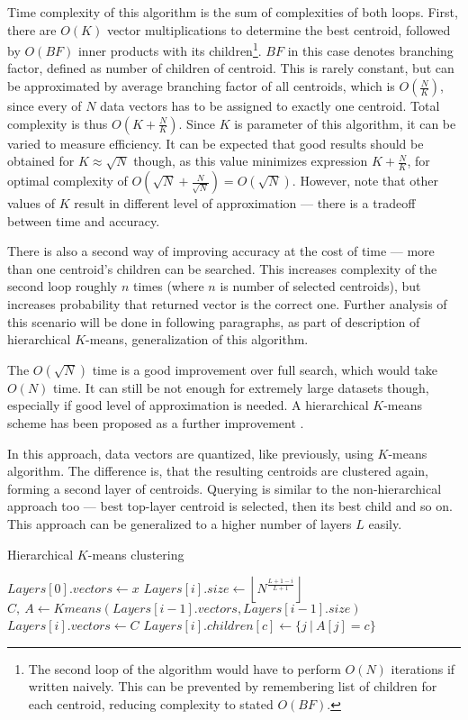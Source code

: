Time complexity of this algorithm is the sum of complexities of both loops.
First, there are $O(K)$ vector multiplications to determine the best centroid,
followed by $O(BF)$ inner products with its children\footnote{The second loop
of the algorithm would have to perform $O(N)$ iterations if written naively.
This can be prevented by remembering list of children for each centroid,
reducing complexity to stated $O(BF)$.}.
$BF$ in this case denotes
branching factor, defined as number of children of centroid. This is rarely
constant, but can be approximated by average branching factor of all centroids,
which is $O(\frac{N}{K})$, since every of $N$ data vectors has to be assigned
to exactly one centroid. Total complexity is thus $O(K + \frac{N}{K})$. Since
$K$ is parameter of this algorithm, it can be varied to measure efficiency. It
can be expected that good results should be obtained for $K \approx \sqrt{N}$ 
though, as this value minimizes expression $K + \frac{N}{K}$, for optimal
complexity of $O(\sqrt{N} + \frac{N}{\sqrt{N}}) = O(\sqrt{N})$. However, note that other
values of $K$ result in different level of approximation --- there is
a tradeoff between time and accuracy. 

There is also a second way of improving accuracy at the cost of time --- more
than one centroid's children can be searched. This increases complexity of the
second loop roughly $n$ times (where $n$ is number of selected centroids),
but increases probability that returned vector is the correct one. Further
analysis of this scenario will be done in following paragraphs, as part
of description of hierarchical $K$-means, generalization of this algorithm.


\bigskip


The $O(\sqrt{N})$ time is a good improvement over full search, which would
take $O(N)$ time. It can still be not enough for extremely large datasets
though, especially if good level of approximation is needed. A hierarchical
$K$-means scheme has been proposed as a further improvement \cite{kmeans}.

In this approach, data vectors are quantized, like previously,
using $K$-means algorithm.
The difference is, that the resulting centroids are clustered again, forming
a second layer of centroids. Querying is similar to the non-hierarchical
approach too --- best top-layer centroid is selected, then its best child and
so on. This approach can be generalized to a higher number of layers $L$ 
easily.


\begin{algorithm}[H]
	\caption{Hierarchical $K$-means clustering}
	\begin{algorithmic}
		\State $ Layers[0].vectors \gets x $
			\State $ Layers[i].size \gets \left \lfloor N^{\frac{L + 1 - i}{L + 1}} \right \rfloor $
			\State $ C,\ A \gets Kmeans(Layers[i - 1].vectors, Layers[i - 1].size) $
			\State $ Layers[i].vectors \gets C $
				\State $ Layers[i].children[c] \gets \{ j\ |\ A[j] = c \} $
			\EndFor
		\EndFor
		\State {}
	\end{algorithmic}
\end{algorithm}

